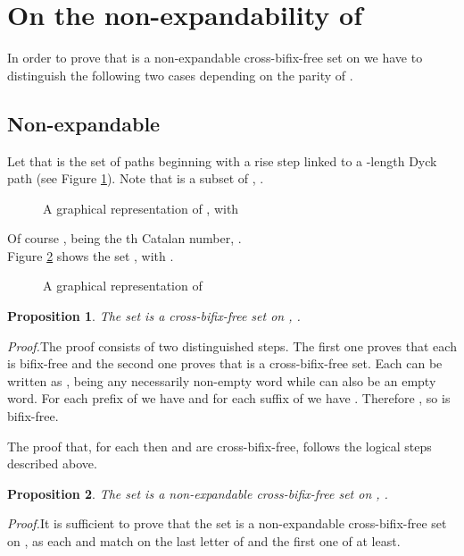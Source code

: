 \documentclass[a4paper,11pt]{article}
\newcommand{\cvd}{\hfill \bigskip}
\newtheorem{proposition}{Proposition}[section]
\begin{document}
\section{On the non-expandability of }
In order to prove that  is a non-expandable
cross-bifix-free set on  we have to distinguish the
following two cases depending on the parity of .

\subsection{Non-expandable } Let  that is the set of paths beginning
with a rise step linked to a -length Dyck path (see Figure
\ref{rappdis}). Note that  is a subset of
, .
\begin{figure}[!htb]
\begin{center}
 \caption{\small{A
graphical representation of , with }
\label{rappdis}}\vspace{-15pt}
\end{center}
\end{figure}

Of course , being  the th
Catalan number, .\\
Figure \ref{rap7} shows the set , with
.
\begin{figure}[!htb]
\begin{center}
 \caption{\small{A
graphical representation of }
\label{rap7}}\vspace{-15pt}
\end{center}
\end{figure}

\begin{proposition}\label{dispariCB}
The set  is a cross-bifix-free set on ,
.
\end{proposition}
\emph{Proof.}\quad The proof consists of two distinguished steps.
The first one proves that each  is
bifix-free and the second one proves that  is a
cross-bifix-free set. Each  can be
written as , being  any necessarily non-empty
word while  can also be an empty word. For each prefix  of
 we have  and for each suffix  of  we have . Therefore ,  so
 is bifix-free.

The proof that, for each  then
 and  are cross-bifix-free, follows the logical
steps described above. \cvd

\begin{proposition}\label{dispariNE}
The set  is a non-expandable cross-bifix-free set on
, .
\end{proposition}
\emph{Proof.}\quad It is sufficient to prove that the set
 is a non-expandable cross-bifix-free set on
, as each  and  match on the last letter of  and
the first one of  at least.
\end{document}
